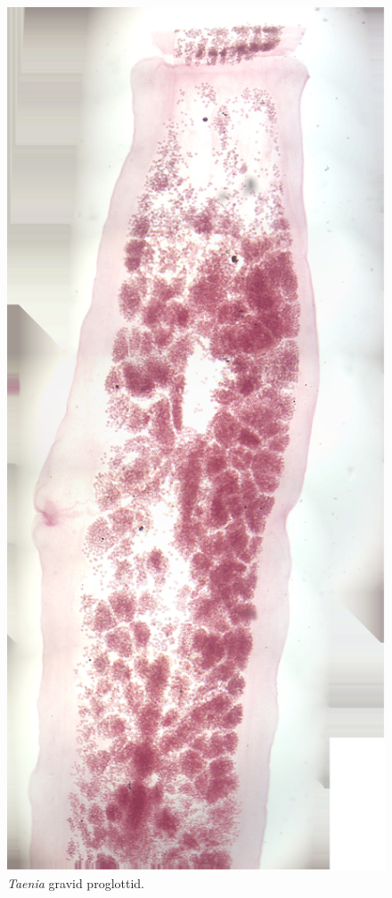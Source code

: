 \begin{figure}

{\centering \includegraphics[width=0.7\linewidth]{./figures/rotifera/taenia_gravid_proglottid}

}

\caption{\emph{Taenia} gravid proglottid.}\label{fig:gravid}
\end{figure}

